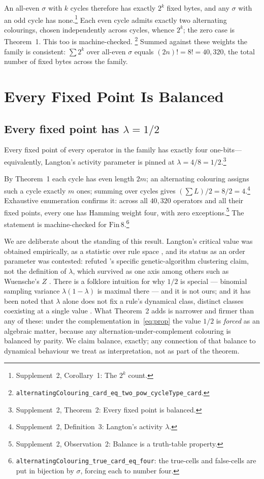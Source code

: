 \documentclass[man,12pt,floatsintext,donotrepeattitle]{apa7}
\newcommand{\sig}{\sigma}
\newcommand{\supptheorytext}[2]{Supplement~2, #1: #2.}
\newcommand{\supptheory}[2]{\footnote{\supptheorytext{#1}{#2}}}
\begin{document}
An all-even $\sig$ with $k$ cycles therefore has exactly $2^k$ fixed bytes, and any
$\sig$ with an odd cycle has none.\supptheory{Corollary~1}{The $2^k$ count}
Each even cycle admits exactly two alternating colourings, chosen independently
across cycles, whence $2^k$; the zero case is Theorem~1. This too
is machine-checked.%
\footnote{\texttt{alternatingColouring\_card\_eq\_two\_pow\_cycleType\_card}.}
Summed against these weights the family is consistent:
$\sum 2^{k}$ over all-even $\sig$ equals $(2n)! = 8! = 40{,}320$, the total
number of fixed bytes across the family.

\section{Every Fixed Point Is Balanced}
\label{sec:lambda}

\subsection{Every fixed point has \texorpdfstring{$\lambda = 1/2$}{lambda = 1/2}}

Every fixed point of every operator in the family has exactly four one-bits---equivalently,
Langton's activity parameter is pinned at $\lambda = 4/8 = 1/2$.\supptheory{Theorem~2}{Every fixed point is balanced}

\noindent By Theorem~1 each cycle has even length $2m$; an
alternating colouring assigns such a cycle exactly $m$ ones; summing over
cycles gives $(\sum L)/2 = 8/2 = 4$.\supptheory{Definition~3}{Langton's activity $\lambda$} Exhaustive enumeration confirms it:
across all $40{,}320$ operators and all their fixed points, every one has
Hamming weight four, with zero exceptions.\supptheory{Observation~2}{Balance is a truth-table property} The statement is machine-checked
for $\mathrm{Fin}\,8$.\footnote{%
\texttt{alternatingColouring\_true\_card\_eq\_four}: the true-cells and
false-cells are put in bijection by $\sig$, forcing each to number four.}

We are deliberate about the standing of this result. Langton's critical
value was obtained empirically, as a statistic over rule space
\parencite{langton1990computation}, and its status as an order parameter
was contested: \textcite{mitchell1993revisiting} refuted
\textcite{packard1988adaptation}'s specific genetic-algorithm clustering
claim, not the definition of $\lambda$, which survived as one axis among
others such as Wuensche's $Z$ \parencite{wuensche1999classifying}. There is
a folklore intuition for why $1/2$ is special --- binomial sampling variance
$\lambda(1-\lambda)$ is maximal there --- and it is not ours; and it has been
noted that $\lambda$ alone does not fix a rule's dynamical class, distinct
classes coexisting at a single value \parencite{sakai2002edge}. What
Theorem~2 adds is narrower and firmer than any of these: under
the complementation in~\eqref{eq:prop} the value $1/2$ is \emph{forced} as an
algebraic matter, because any alternation-under-complement colouring is
balanced by parity. We claim balance, exactly; any connection of that
balance to dynamical behaviour we treat as interpretation, not as part of the
theorem.
\end{document}

